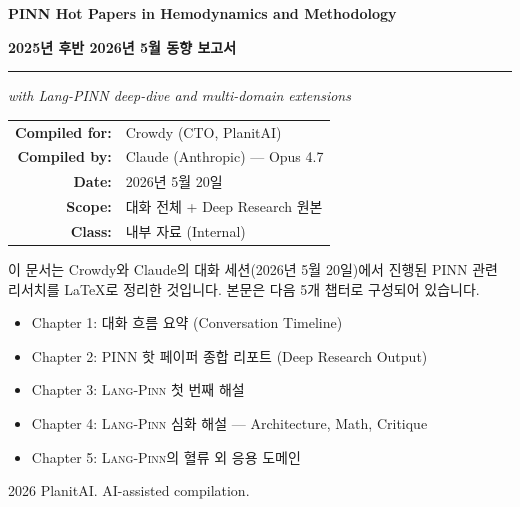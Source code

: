\documentclass[11pt,a4paper,oneside]{report}
\newcommand{\langpinn}{\textsc{Lang-Pinn}}
\begin{document}
\begin{titlepage}
\centering
\vspace*{2.5cm}

{\Huge\bfseries PINN Hot Papers in Hemodynamics and Methodology \par}
\vspace{0.4cm}
{\Large\bfseries 2025년 후반 \textendash{} 2026년 5월 동향 보고서 \par}

\vspace{0.6cm}
\rule{12cm}{0.5pt}
\vspace{0.6cm}

{\large\itshape with Lang-PINN deep-dive and multi-domain extensions \par}

\vspace{2.5cm}

\begin{tabular}{rl}
\textbf{Compiled for:} & Crowdy (CTO, PlanitAI) \\[4pt]
\textbf{Compiled by:}  & Claude (Anthropic) --- Opus 4.7 \\[4pt]
\textbf{Date:}         & 2026년 5월 20일 \\[4pt]
\textbf{Scope:}        & 대화 전체 + Deep Research 원본 \\[4pt]
\textbf{Class:}        & 내부 자료 (Internal) \\
\end{tabular}

\vspace{2cm}

\begin{infobox}
이 문서는 Crowdy와 Claude의 대화 세션(2026년 5월 20일)에서 진행된 PINN 관련 리서치를 LaTeX로 정리한 것입니다. 본문은 다음 5개 챕터로 구성되어 있습니다.
\begin{itemize}
\item Chapter 1: 대화 흐름 요약 (Conversation Timeline)
\item Chapter 2: PINN 핫 페이퍼 종합 리포트 (Deep Research Output)
\item Chapter 3: \langpinn{} 첫 번째 해설
\item Chapter 4: \langpinn{} 심화 해설 — Architecture, Math, Critique
\item Chapter 5: \langpinn{}의 혈류 외 응용 도메인
\end{itemize}
\end{infobox}

\vfill
{\small\textcopyright{} 2026 PlanitAI. AI-assisted compilation.\par}
\end{titlepage}
\end{document}
